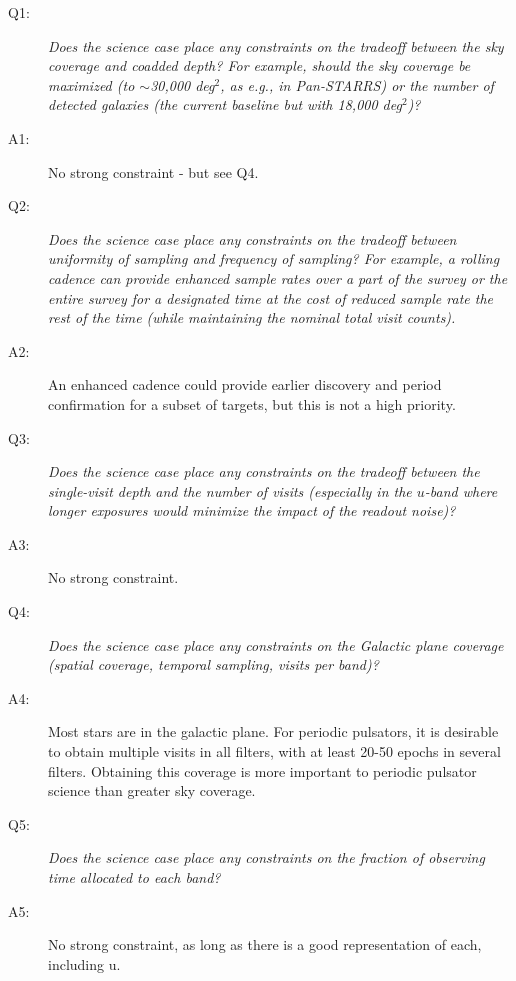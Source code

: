 \begin{description}

 \item[Q1:] {\it Does the science case place any constraints on the
 tradeoff between the sky coverage and coadded depth? For example, should
 the sky coverage be maximized (to $\sim$30,000 deg$^2$, as e.g., in
 Pan-STARRS) or the number of detected galaxies (the current baseline but
 with 18,000 deg$^2$)?}

 \item[A1:] No strong constraint - but see Q4.

 \item[Q2:] {\it Does the science case place any constraints on the
 tradeoff between uniformity of sampling and frequency of  sampling? For
 example, a rolling cadence can provide enhanced sample rates over a part
 of the survey or the entire survey for a designated time at the cost of
 reduced sample rate the rest of the time (while maintaining the nominal
 total visit counts).}

 \item[A2:] An enhanced cadence could provide earlier discovery and period confirmation for a subset of targets, but this is not a high priority.

 \item[Q3:] {\it Does the science case place any constraints on the
 tradeoff between the single-visit depth and the number of visits
 (especially in the $u$-band where longer exposures would minimize the
 impact of the readout noise)?}

 \item[A3:] No strong constraint.

 \item[Q4:] {\it Does the science case place any constraints on the
 Galactic plane coverage (spatial coverage, temporal sampling, visits per
 band)?}

 \item[A4:] Most stars are in the galactic plane. For periodic pulsators, it is desirable to obtain multiple visits
in all filters, with at least 20-50 epochs in several filters. Obtaining this coverage is more important to periodic 
pulsator science than greater sky coverage.

 \item[Q5:] {\it Does the science case place any constraints on the
 fraction of observing time allocated to each band?}

 \item[A5:] No strong constraint, as long as there is a good representation of each, including u.


\end{description}
